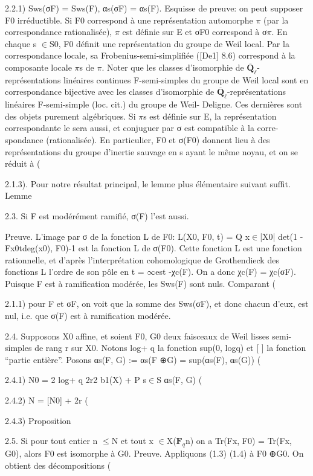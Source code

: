 \documentclass[11pt]{article}
\begin{document}
2.2.1) Sws(σF) = Sws(F), αs(σF) = αs(F). Esquisse de preuve: on peut supposer F0 irréductible. Si F0 correspond à une représentation automorphe \(\pi\) (par la correspondance rationalisée), \(\pi\) est définie sur E et σF0 correspond à σ\(\pi\). En chaque s \(\in\)S0, F0 définit une représentation du groupe de Weil local. Par la correspondance locale, sa Frobenius-semi-simplifiée ([De1] 8.6) correspond à la composante locale \(\pi\)s de \(\pi\). Noter que les classes d’isomorphie de \(\overline{\mathbf Q}_\ell\)-représentations linéaires continues F-semi-simples du groupe de Weil local sont en correspondance bijective avec les classes d’isomorphie de \(\overline{\mathbf Q}_\ell\)-représentations linéaires F-semi-simple (loc. cit.) du groupe de Weil- Deligne. Ces dernières sont des objets purement algébriques. Si \(\pi\)s est définie sur E, la représentation correspondante le sera aussi, et conjuguer par σ est compatible à la corre- spondance (rationalisée). En particulier, F0 et σ(F0) donnent lieu à des représentations du groupe d’inertie sauvage en s ayant le même noyau, et on se réduit à (

2.1.3). Pour notre résultat principal, le lemme plus élémentaire suivant suffit. Lemme 

2.3. Si F est modérément ramifié, σ(F) l’est aussi.

Preuve. L’image par σ de la fonction L de F0: L(X0, F0, t) = Q x\(\in\)|X0| det(1 -Fx0tdeg(x0), F0)-1 est la fonction L de σ(F0). Cette fonction L est une fonction rationnelle, et d’après l’interprétation cohomologique de Grothendieck des fonctions L l’ordre de son pôle en t = \(\infty\)est -χc(F). On a donc χc(F) = χc(σF). Puisque F est à ramification modérée, les Sws(F) sont nuls. Comparant (

2.1.1) pour F et σF, on voit que la somme des Sws(σF), et donc chacun d’eux, est nul, i.e. que σ(F) est à ramification modérée. 

2.4. Supposons X0 affine, et soient F0, G0 deux faisceaux de Weil lisses semi-simples de rang r sur X0. Notons log+ q la fonction sup(0, logq) et [ ] la fonction “partie entière”. Posons αs(F, G) := αs(F ⊕G) = sup(αs(F), αs(G)) (

2.4.1) N0 = 2 log+ q  2r2 b1(X) + P s\(\in\)S αs(F, G)  (

2.4.2) N = [N0] + 2r (

2.4.3) Proposition 

2.5. Si pour tout entier n \(\le\)N et tout x \(\in\)X(\(\mathbf F_q\)n) on a Tr(Fx, F0) = Tr(Fx, G0), alors F0 est isomorphe à G0. Preuve. Appliquons (1.3) (1.4) à F0 ⊕G0. On obtient des décompositions (
\end{document}
